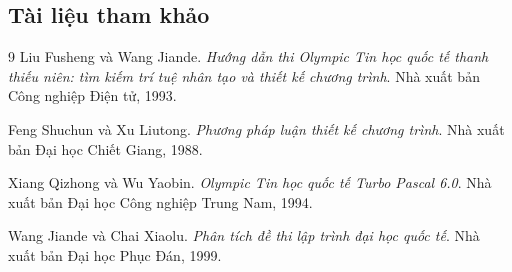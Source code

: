 \documentclass[11pt]{article}
\begin{document}
\subsection*{Tài liệu tham khảo}

\begin{thebibliography}{9}
Liu Fusheng và Wang Jiande.
\textit{Hướng dẫn thi Olympic Tin học quốc tế thanh thiếu niên: tìm kiếm trí
tuệ nhân tạo và thiết kế chương trình}.
Nhà xuất bản Công nghiệp Điện tử, 1993.

Feng Shuchun và Xu Liutong.
\textit{Phương pháp luận thiết kế chương trình}.
Nhà xuất bản Đại học Chiết Giang, 1988.

Xiang Qizhong và Wu Yaobin.
\textit{Olympic Tin học quốc tế Turbo Pascal 6.0}.
Nhà xuất bản Đại học Công nghiệp Trung Nam, 1994.

Wang Jiande và Chai Xiaolu.
\textit{Phân tích đề thi lập trình đại học quốc tế}.
Nhà xuất bản Đại học Phục Đán, 1999.
\end{thebibliography}
\end{document}

